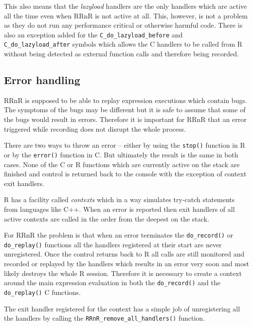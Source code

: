 \documentclass[thesis=M,english,hidelinks]{FITthesis}[2012/10/20]
\begin{document}
		This also means that the \emph{lazyload} handlers are the only handlers which are active all the time even when RRnR is not active at all. This, however, is not a problem as they do not run any performance critical or otherwise harmful code. There is also an exception added for the \lstinline|C_do_lazyload_before| and \lstinline|C_do_lazyload_after| symbols which allows the C handlers to be called from R without being detected as external function calls and therefore being recorded.\par
		
		\subsection{Error handling}
		RRnR is supposed to be able to replay expression executions which contain bugs. The symptoms of the bugs may be different but it is safe to assume that some of the bugs would result in errors. Therefore it is important for RRnR that an error triggered while recording does not disrupt the whole process.\par
		
		There are two ways to throw an error -- either by using the \lstinline|stop()| function in R or by the \lstinline|error()| function in C. But ultimately the result is the same in both cases. None of the C or R functions which are currently active on the stack are finished and control is returned back to the console with the exception of context exit handlers.\par
		
		R has a facility called \emph{contexts} which in a way simulates try-catch statements from languages like C++. When an error is reported then exit handlers of all active contexts are called in the order from the deepest on the stack.\par
		
		For RRnR the problem is that when an error terminates the \lstinline|do_record()| or \lstinline|do_replay()| functions all the handlers registered at their start are never unregistered. Once the control returns back to R all calls are still monitored and recorded or replayed by the handlers which results in an error very soon and most likely destroys the whole R session. Therefore it is necessary to create a context around the main expression evaluation in both the \lstinline|do_record()| and the \lstinline|do_replay()| C functions.\par
		
		The exit handler registered for the context has a simple job of unregistering all the handlers by calling the \lstinline|RRnR_remove_all_handlers()| function.\par
		
\end{document}

